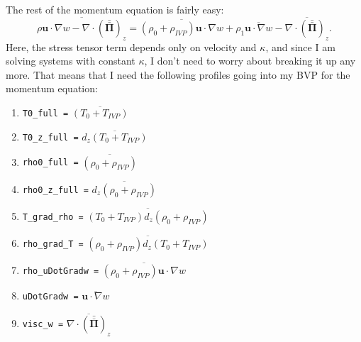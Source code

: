 \documentclass[aps, pre, onecolumn, nofootinbib, notitlepage, groupedaddress, amsfonts, amssymb, amsmath, longbibliography]{revtex4-1}
\newcommand{\Div}[1]{\ensuremath{\nabla\cdot\left( #1\right)}}
\newcommand{\grad}{\ensuremath{\nabla}}
\newcommand{\stressT}{\ensuremath{\bm{\bar{\bar{\Pi}}}}}
\begin{document}
The rest of the momentum equation is fairly easy:
\begin{equation}
\overline{\rho\bm{u}\cdot\grad w - \Div{\stressT}_z} =
\overline{(\rho_0 + \rho_{IVP})\bm{u}\cdot\grad w} + \rho_1\overline{\bm{u}\cdot\grad w}
- \overline{\Div{\stressT}_z}.
\end{equation}
Here, the stress tensor term depends only on velocity and $\kappa$, and since I am solving systems with constant
$\kappa$, I don't need to worry about breaking it up any more.  That means that I need the
following profiles going into my BVP for the momentum equation:
\begin{enumerate}
\item \texttt{T0\_full =}		 $\overline{(T_0 + T_{IVP})}$
\item \texttt{T0\_z\_full =}		 $\overline{d_z(T_0 + T_{IVP})}$
\item \texttt{rho0\_full =}		 $\overline{(\rho_0 + \rho_{IVP})}$
\item \texttt{rho0\_z\_full =}	 $\overline{d_z(\rho_0 + \rho_{IVP})}$
\item \texttt{T\_grad\_rho =}		 $\overline{(T_0 + T_{IVP})d_z(\rho_0 + \rho_{IVP})}$
\item \texttt{rho\_grad\_T =}      $\overline{(\rho_0 + \rho_{IVP})d_z(T_0 + T_{IVP})}$
\item \texttt{rho\_uDotGradw =}   $\overline{(\rho_0 + \rho_{IVP})\bm{u}\cdot\grad w}$
\item \texttt{uDotGradw =}       $\overline{\bm{u}\cdot\grad w}$
\item \texttt{visc\_w =}         $\overline{\Div{\stressT}_z}$
\end{enumerate}
\end{document}
